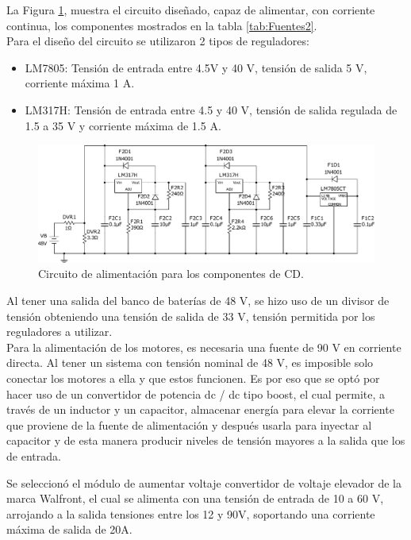 La Figura \ref{fig:vcircuitofuente}, muestra el circuito diseñado, capaz de alimentar, con corriente continua, los componentes mostrados en la tabla \ref{tab:Fuentes2}.\\

Para el diseño del circuito se utilizaron 2 tipos de reguladores:
\begin{itemize}
	\item LM7805: Tensión de entrada entre 4.5V y 40 V, tensión de salida 5 V, corriente máxima 1 A.
	\item LM317H: Tensión de entrada entre 4.5 y 40 V, tensión de salida regulada de 1.5 a 35 V y corriente máxima de 1.5 A.
\end{itemize}

\begin{figure}[H]
	\centering
	\includegraphics[width=15cm]{imagenes/fuentes3f.pdf}
	\caption{Circuito de alimentación para los componentes de CD.}
	\label{fig:vcircuitofuente}
\end{figure}

Al tener una salida del banco de baterías de 48 V, se hizo uso de un divisor de tensión obteniendo una tensión de salida de 33 V, tensión permitida por los reguladores a utilizar.\\

Para la alimentación de los motores, es necesaria una fuente de 90 V en corriente directa. Al tener un sistema con tensión nominal de 48 V, es imposible solo conectar los motores a ella y que estos funcionen. Es por eso que se optó por hacer uso de un convertidor de potencia dc / dc tipo boost, el cual permite, a través de un inductor y un capacitor, almacenar energía para elevar la corriente que proviene de la fuente de alimentación y después usarla para inyectar al capacitor y de esta manera producir niveles de tensión mayores a la salida que los de entrada. 

Se seleccionó el módulo de aumentar voltaje convertidor de voltaje elevador de la marca Walfront, el cual se alimenta con una tensión de entrada de 10 a 60 V, arrojando a la salida tensiones entre los 12 y 90V, soportando una corriente  máxima de salida de 20A.

